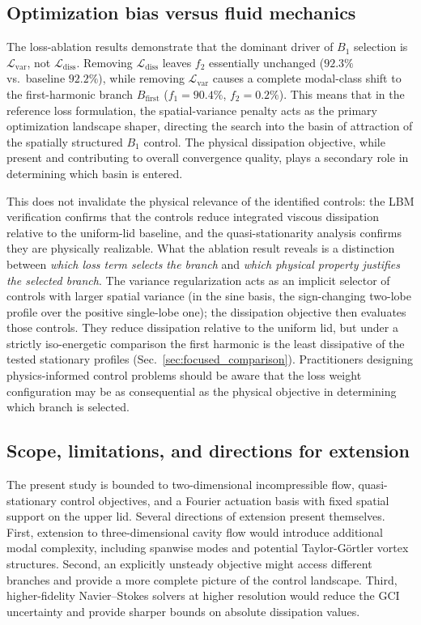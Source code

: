 \documentclass[a4paper,11pt]{article}
\begin{document}
\subsection{Optimization bias versus fluid mechanics}

The loss-ablation results demonstrate that the dominant driver of \(B_1\) selection
is \(\mathcal{L}_{\mathrm{var}}\), not \(\mathcal{L}_{\mathrm{diss}}\). Removing
\(\mathcal{L}_{\mathrm{diss}}\) leaves \(f_2\) essentially unchanged (\(92.3\%\)
vs.\ baseline \(92.2\%\)), while removing \(\mathcal{L}_{\mathrm{var}}\) causes a
complete modal-class shift to the first-harmonic branch \(B_{\mathrm{first}}\)
(\(f_1=90.4\%\), \(f_2=0.2\%\)). This means that in the reference loss
formulation, the spatial-variance penalty acts as the primary optimization landscape
shaper, directing the search into the basin of attraction of the spatially structured
\(B_1\) control. The physical dissipation objective, while present and contributing
to overall convergence quality, plays a secondary role in determining which basin
is entered.

This does not invalidate the physical relevance of the identified controls: the
LBM verification confirms that the controls reduce integrated viscous dissipation
relative to the uniform-lid baseline, and the quasi-stationarity analysis confirms
they are physically realizable. What the ablation result reveals is a distinction
between \emph{which loss term selects the branch} and \emph{which physical property
justifies the selected branch}. The variance regularization acts as an implicit
selector of controls with larger spatial variance (in the sine basis, the
sign-changing two-lobe profile over the positive single-lobe one); the dissipation
objective then evaluates those controls. They reduce dissipation relative to the
uniform lid, but under a strictly iso-energetic comparison the first harmonic is
the least dissipative of the tested stationary profiles
(Sec.~\ref{sec:focused_comparison}). Practitioners
designing physics-informed control problems should be aware that the loss weight
configuration may be as consequential as the physical objective in determining which
branch is selected.

\subsection{Scope, limitations, and directions for extension}

The present study is bounded to two-dimensional incompressible flow, quasi-stationary
control objectives, and a Fourier actuation basis with fixed spatial support on the
upper lid. Several directions of extension present themselves. First, extension to
three-dimensional cavity flow would introduce additional modal complexity, including
spanwise modes and potential Taylor-G\"{o}rtler vortex structures. Second, an
explicitly unsteady objective might access different branches and provide a more
complete picture of the control landscape. Third, higher-fidelity Navier--Stokes
solvers at higher resolution would reduce the GCI uncertainty and provide sharper
bounds on absolute dissipation values.
\end{document}
